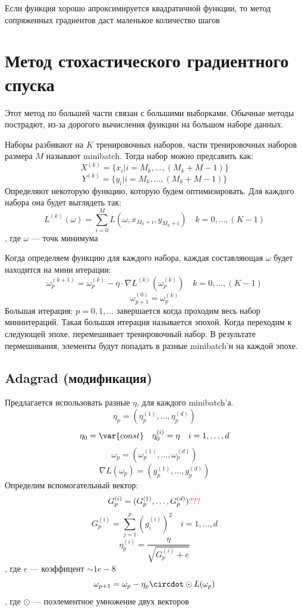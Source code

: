 \documentclass[oneside]{book}
\newcommand{\const}{\var{const}}
\theoremstyle{plain}
\theoremstyle{remark}
\theoremstyle{definition}
\begin{document}
Если функция хорошо апроксимируется квадратичной функции, то метод сопряженных градиентов даст маленькое количество шагов
\section{Метод стохастического градиентного спуска}
\label{sec:org7be14cf}
Этот метод по большей части связан с большими выборками. Обычные методы пострадют, из-за дорогого вычисления функции на большом наборе данных.

Наборы разбивают на \(K\) тренировочных наборов, части тренировочных наборов размера \(M\) называют minibatch. Тогда набор можно предсавить как:
\[ X^{(k)} = \{x_i | i = M_k,\dots,(M_k + M - 1)\} \]
\[ Y^{(k)} = \{y_i | i = M_k,\dots,(M_k + M - 1)\} \]
Определяют некоторую функцию, которую будем оптимизировать. Для каждого набора она будет выглядеть так:
\[ L^{(k)}(\omega) = \sum_{i = 0}^M L(\omega, x_{M_k + i}, y_{M_k + i}) \quad k = 0,\dots,(K - 1)\]
, где \(\omega\) --- точк минимума

Когда определяем функцию для каждого набора, каждая составляющая \(\omega\) будет находится на мини итерации:
\[ \omega_p^{(k + 1)} = \omega_p^{(k)} - \eta \cdot \nabla L^{(k)}(\omega_p^{(k)}) \quad k = 0,\dots,(K - 1)\]
\[ \omega^{(0)}_{p + 1} = \omega^{(k)}_p \]
Большая итерация: \(p = 0,1,\dots\) завершается когда проходим весь набор миниитераций. Такая большая итерация называется эпохой. Когда переходим к следующей эпохе, перемешивает тренировочный набор. В результате пермешивания, элементы будут попадать в разные minibatch'и на каждой эпохе.

\subsection{Adagrad (модификация)}
\label{sec:orgda14e40}
Предлагается использовать разные \(\eta\), для каждого minibatch'а.
\[ \eta_p = (\eta^{(1)}_p,\dots,\eta_p^{(d)}) \]
\[ \eta_0 = \const \quad \eta^{(i)}_0 = \eta \quad i = 1,\dots,d\]
\[ \omega_p = (\omega^{(1)}_p,\dots,\omega^{(d)}_p) \]
\[ \nabla L(\omega_p) = (g^{(1)}_p,\dots,g^{(d)}_p) \]
Определим вспомогательный вектор:
\[ G^{(i)}_p = (G^{(1)}_p,\dots,G^{(d)}_p) \color{red}???\color{black} \]
\[ G^{(i)}_p = \sum_{j = 1}^p (g_i^{(i)})^2 \quad i = 1,\dots,d\]
\[ \eta_p^{(i)} = \frac{\eta}{\sqrt{G^{(i)}_p + e}} \]
, где \(e\) --- коэффицент \(\sim 1e-8\)
\[ \omega_{p + 1} = \omega_p - \eta_p \circdot \odot L(\omega_p) \], где \(\odot\) --- поэлементное умножение двух векторов
\end{document}
